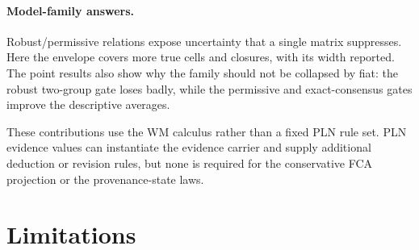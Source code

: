 \documentclass[11pt]{article}
\begin{document}
\paragraph{Model-family answers.}
Robust/permissive relations expose uncertainty that a single matrix suppresses.
Here the envelope covers more true cells and closures, with its width reported.
The point results also show why the family should not be collapsed by fiat:
the robust two-group gate loses badly, while the permissive and exact-consensus
gates improve the descriptive averages.

These contributions use the WM calculus rather than a fixed PLN rule set. PLN
evidence values can instantiate the evidence carrier and supply additional
deduction or revision rules, but none is required for the conservative FCA
projection or the provenance-state laws.

\section{Limitations}
\label{sec:limitations}
\end{document}
